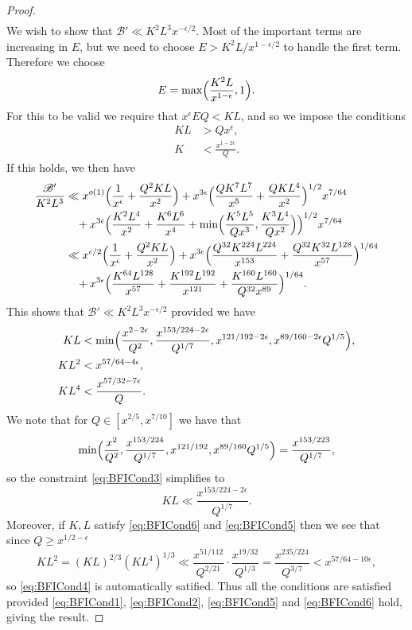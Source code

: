 \documentclass[10pt]{amsart}
\theoremstyle{plain}
\numberwithin{equation}{section}
\begin{document}
\begin{proof}
\begin{align*}
\end{align*}
We wish to show that $\mathscr{B}'\ll K^2L^3x^{-\epsilon/2}$. Most of the important terms are increasing in $E$, but we need to choose $E>K^2 L/x^{1-\epsilon/2}$ to handle the first term. Therefore we choose 
\[
E=\max\Bigl(\frac{K^2 L}{x^{1-\epsilon}},1\Bigr).
\]
For this to be valid we require that $x^{\epsilon} E Q<KL$, and so we impose the conditions
\begin{align}
KL&>Q x^\epsilon,\label{eq:BFICond1}\\
K&<\frac{x^{1-2\epsilon} }{Q}.\label{eq:BFICond2}
\end{align}
If this holds, we then have
\begin{align*}
\frac{\mathscr{B}'}{K^2L^3} &\ll x^{o(1)}\Bigl(\frac{1}{x^\epsilon} +\frac{Q^2 K L}{x^2}\Bigr)+x^{3\epsilon} \Bigl( \frac{Q K^{7} L^{7} }{x^5}+
\frac{Q K L^{4} }{x^2} \Bigr)^{1/2}x^{7/64}\\
&\quad +x^{3\epsilon}\Bigl(\frac{K^2 L^4}{x^2}+\frac{K^6 L^{6} }{x^4}+\min\Bigl(\frac{K^5 L^{5} }{Q x^3}, \frac{K^3 L^4 }{Q x^2}\Bigr)\Bigr)^{1/2}x^{7/64}\\
&\ll x^{\epsilon/2}\Bigl(\frac{1}{x^\epsilon} +\frac{Q^2 K L}{x^2}\Bigr)+x^{3\epsilon} \Bigl( \frac{Q^{32} K^{224} L^{224} }{x^{153} }+\frac{Q^{32}K^{32}L^{128}}{x^{57}}\Bigr)^{1/64}\\
&\quad +x^{3\epsilon}\Bigl(\frac{K^{64} L^{128}}{x^{57}}+\frac{K^{192} L^{192}}{x^{121}}+\frac{K^{160} L^{160} }{Q^{32} x^{89}} \Bigr)^{1/64}.
\end{align*}
This shows that $\mathscr{B}'\ll K^2 L^3 x^{-\epsilon/2}$ provided we have
\begin{align}
K L&<\min\Bigl(\frac{ x^{2-2\epsilon}}{Q^2},\frac{x^{153/224-2\epsilon}}{Q^{1/7}},x^{121/192-2\epsilon},x^{89/160-2\epsilon}Q^{1/5}\Bigr),\label{eq:BFICond3}\\
KL^2&<x^{57/64-4\epsilon},\label{eq:BFICond4}\\
KL^4&<\frac{x^{57/32-7\epsilon}}{Q}.\label{eq:BFICond5}
\end{align}
We note that for $Q\in[x^{2/5},x^{7/10}]$ we have that 
\[
\min\Bigl(\frac{ x^{2}}{Q^2},\frac{x^{153/224}}{Q^{1/7}},x^{121/192},x^{89/160}Q^{1/5}\Bigr)=\frac{x^{153/223}}{Q^{1/7}},
\]
so the constraint \eqref{eq:BFICond3} simplifies to 
\begin{equation}
KL\ll \frac{x^{153/224-2\epsilon}}{Q^{1/7}}.\label{eq:BFICond6}
\end{equation}
 Moreover, if $K,L$ satisfy \eqref{eq:BFICond6} and \eqref{eq:BFICond5} then we see that since $Q\ge x^{1/2-\epsilon}$
\[
KL^2= (KL)^{2/3}(KL^4)^{1/3}\ll \frac{x^{51/112}}{Q^{2/21}}\cdot \frac{x^{19/32}}{Q^{1/3}}=\frac{x^{235/224}}{Q^{3/7}}<x^{57/64-10\epsilon},
\]
so \eqref{eq:BFICond4} is automatically satified. Thus all the conditions are satisfied provided \eqref{eq:BFICond1}, \eqref{eq:BFICond2}, \eqref{eq:BFICond5} and \eqref{eq:BFICond6} hold, giving the result.
\end{proof}
\end{document}
